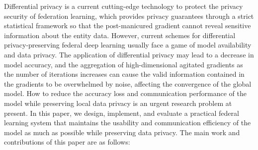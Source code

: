 Differential privacy is a current cutting-edge technology to protect the privacy security of federation learning, which provides privacy guarantees through a strict statistical framework so that the post-manicured gradient cannot reveal sensitive information about the entity data. However, current schemes for differential privacy-preserving federal deep learning usually face a game of model availability and data privacy. The application of differential privacy may lead to a decrease in model accuracy, and the aggregation of high-dimensional agitated gradients as the number of iterations increases can cause the valid information contained in the gradients to be overwhelmed by noise, affecting the convergence of the global model. How to reduce the accuracy loss and communication performance of the model while preserving local data privacy is an urgent research problem at present. In this paper, we design, implement, and evaluate a practical federal learning system that maintains the usability and communication efficiency of the model as much as possible while preserving data privacy. The main work and contributions of this paper are as follows:

